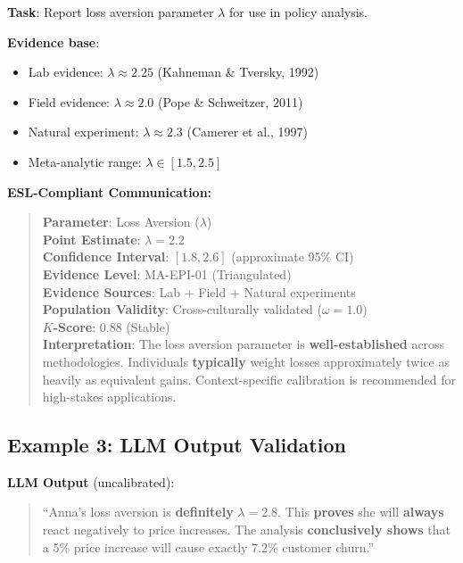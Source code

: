 \documentclass[11pt,a4paper]{article}
\begin{document}
\begin{practicalbox}[title={Scenario: Reporting Loss Aversion Estimate}]
\textbf{Task}: Report loss aversion parameter $\lambda$ for use in policy analysis.

\textbf{Evidence base}:
\begin{itemize}
    \item Lab evidence: $\lambda \approx 2.25$ (Kahneman \& Tversky, 1992)
    \item Field evidence: $\lambda \approx 2.0$ (Pope \& Schweitzer, 2011)
    \item Natural experiment: $\lambda \approx 2.3$ (Camerer et al., 1997)
    \item Meta-analytic range: $\lambda \in [1.5, 2.5]$
\end{itemize}
\end{practicalbox}

\textbf{ESL-Compliant Communication:}

\begin{quote}
\textbf{Parameter}: Loss Aversion ($\lambda$) \\
\textbf{Point Estimate}: $\lambda = 2.2$ \\
\textbf{Confidence Interval}: $[1.8, 2.6]$ (approximate 95\% CI) \\
\textbf{Evidence Level}: MA-EPI-01 (Triangulated) \\
\textbf{Evidence Sources}: Lab + Field + Natural experiments \\
\textbf{Population Validity}: Cross-culturally validated ($\omega = 1.0$) \\
\textbf{$K$-Score}: 0.88 (Stable) \\[0.5em]
\textbf{Interpretation}: The loss aversion parameter is \textbf{well-established} across methodologies. Individuals \textbf{typically} weight losses approximately twice as heavily as equivalent gains. Context-specific calibration is recommended for high-stakes applications.
\end{quote}

\subsection{Example 3: LLM Output Validation}

\begin{practicalbox}[title={Scenario: Validating LLM-Generated Analysis}]
\textbf{LLM Output} (uncalibrated):
\begin{quote}
``Anna's loss aversion is \textbf{definitely} $\lambda = 2.8$. This \textbf{proves} she will \textbf{always} react negatively to price increases. The analysis \textbf{conclusively shows} that a 5\% price increase will cause exactly 7.2\% customer churn.''
\end{quote}
\end{practicalbox}
\end{document}
